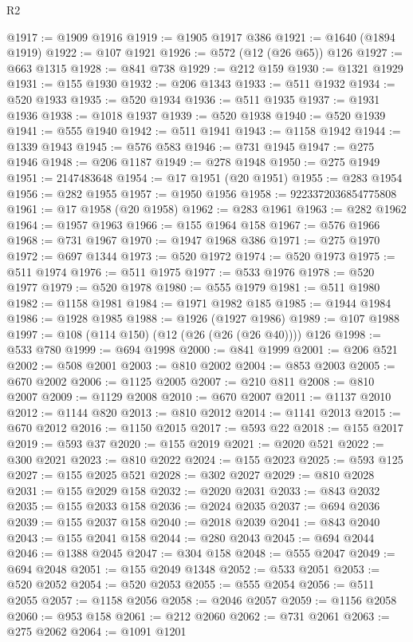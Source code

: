 \begin{lexlean}{R2}
\begin{coremodule}
@1917 := @1909 @1916
@1919 := @1905 @1917 @386
@1921 := @1640 (@1894 @1919)
@1922 := @107 @1921
@1926 := @572 (@12 (@26 @65)) @126
@1927 := @663 @1315
@1928 := @841 @738
@1929 := @212 @159
@1930 := @1321 @1929
@1931 := @155 @1930
@1932 := @206 @1343
@1933 := @511 @1932
@1934 := @520 @1933
@1935 := @520 @1934
@1936 := @511 @1935
@1937 := @1931 @1936
@1938 := @1018 @1937
@1939 := @520 @1938
@1940 := @520 @1939
@1941 := @555 @1940
@1942 := @511 @1941
@1943 := @1158 @1942
@1944 := @1339 @1943
@1945 := @576 @583
@1946 := @731 @1945
@1947 := @275 @1946
@1948 := @206 @1187
@1949 := @278 @1948
@1950 := @275 @1949
@1951 := 2147483648
@1954 := @17 @1951 (@20 @1951)
@1955 := @283 @1954
@1956 := @282 @1955
@1957 := @1950 @1956
@1958 := 9223372036854775808
@1961 := @17 @1958 (@20 @1958)
@1962 := @283 @1961
@1963 := @282 @1962
@1964 := @1957 @1963
@1966 := @155 @1964 @158
@1967 := @576 @1966
@1968 := @731 @1967
@1970 := @1947 @1968 @386
@1971 := @275 @1970
@1972 := @697 @1344
@1973 := @520 @1972
@1974 := @520 @1973
@1975 := @511 @1974
@1976 := @511 @1975
@1977 := @533 @1976
@1978 := @520 @1977
@1979 := @520 @1978
@1980 := @555 @1979
@1981 := @511 @1980
@1982 := @1158 @1981
@1984 := @1971 @1982 @185
@1985 := @1944 @1984
@1986 := @1928 @1985
@1988 := @1926 (@1927 @1986)
@1989 := @107 @1988
@1997 := @108 (@114 @150) (@12 (@26 (@26 (@26 @40)))) @126
@1998 := @533 @780
@1999 := @694 @1998
@2000 := @841 @1999
@2001 := @206 @521
@2002 := @508 @2001
@2003 := @810 @2002
@2004 := @853 @2003
@2005 := @670 @2002
@2006 := @1125 @2005
@2007 := @210 @811
@2008 := @810 @2007
@2009 := @1129 @2008
@2010 := @670 @2007
@2011 := @1137 @2010
@2012 := @1144 @820
@2013 := @810 @2012
@2014 := @1141 @2013
@2015 := @670 @2012
@2016 := @1150 @2015
@2017 := @593 @22
@2018 := @155 @2017
@2019 := @593 @37
@2020 := @155 @2019
@2021 := @2020 @521
@2022 := @300 @2021
@2023 := @810 @2022
@2024 := @155 @2023
@2025 := @593 @125
@2027 := @155 @2025 @521
@2028 := @302 @2027
@2029 := @810 @2028
@2031 := @155 @2029 @158
@2032 := @2020 @2031
@2033 := @843 @2032
@2035 := @155 @2033 @158
@2036 := @2024 @2035
@2037 := @694 @2036
@2039 := @155 @2037 @158
@2040 := @2018 @2039
@2041 := @843 @2040
@2043 := @155 @2041 @158
@2044 := @280 @2043
@2045 := @694 @2044
@2046 := @1388 @2045
@2047 := @304 @158
@2048 := @555 @2047
@2049 := @694 @2048
@2051 := @155 @2049 @1348
@2052 := @533 @2051
@2053 := @520 @2052
@2054 := @520 @2053
@2055 := @555 @2054
@2056 := @511 @2055
@2057 := @1158 @2056
@2058 := @2046 @2057
@2059 := @1156 @2058
@2060 := @953 @158
@2061 := @212 @2060
@2062 := @731 @2061
@2063 := @275 @2062
@2064 := @1091 @1201

\end{coremodule}
\end{lexlean}
